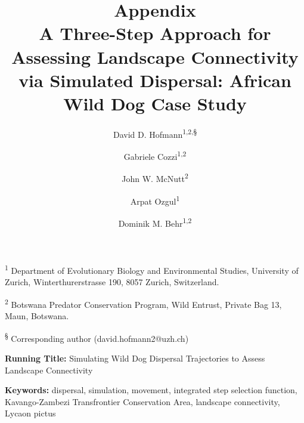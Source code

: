 \documentclass[abstract=off,10pt,a4paper,bibliography=totocnumbered]{article}
\title{\textbf{Appendix}\\ A Three-Step Approach for Assessing Landscape
Connectivity via Simulated Dispersal: African Wild Dog Case Study}
\author{
  David D. Hofmann\textsuperscript{1,2,\S} \orcid{0000-0003-3477-4365} \and
  Gabriele Cozzi\textsuperscript{1,2} \orcid{0000-0002-1744-1940} \and
  John W. McNutt\textsuperscript{2} \and
  Arpat Ozgul\textsuperscript{1} \orcid{0000-0001-7477-2642} \and
  Dominik M. Behr\textsuperscript{1,2} \orcid{0000-0001-7378-8538}
}
\newcommand{\beginappendix}{%
  \setcounter{table}{0}
  \renewcommand{\thetable}{S\arabic{table}}%
  \setcounter{figure}{0}
  \renewcommand{\thefigure}{S\arabic{figure}}%
  \setcounter{equation}{0}
  \renewcommand{\theequation}{Equation S\arabic{equation}}%
  \setcounter{section}{0}
  \renewcommand{\thesection}{A.\arabic{section}}%
}
\begin{document}



\maketitle

\begin{flushleft}

\vspace{0.5cm}

\textsuperscript{1} Department of Evolutionary Biology and Environmental
Studies, University of Zurich, Winterthurerstrasse 190, 8057 Zurich,
Switzerland.

\textsuperscript{2} Botswana Predator Conservation Program, Wild Entrust,
Private Bag 13, Maun, Botswana.

\textsuperscript{\S} Corresponding author (david.hofmann2@uzh.ch)

\vspace{4cm}

\textbf{Running Title:} Simulating Wild Dog Dispersal Trajectories to Assess
Landscape Connectivity

\vspace{0.5cm}

\textbf{Keywords:} dispersal, simulation, movement, integrated step selection
function, Kavango-Zambezi Transfrontier Conservation Area, landscape
connectivity, Lycaon pictus

\end{flushleft}

\newpage


\linenumbers

\appendix
\beginappendix

\newpage
\end{document}
